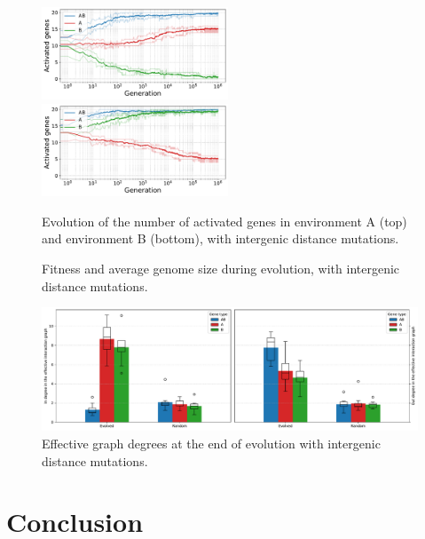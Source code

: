 \begin{figure}[H]
  \centering
  \includegraphics[width=0.495\textwidth]{param/evolve-intergene/gene_activity_env_A.pdf}
  \includegraphics[width=0.495\textwidth]{param/evolve-intergene/gene_activity_env_B.pdf}
  \caption[Evolution of the number of activated genes in each environment, with intergenic distance mutations]{Evolution of the number of activated genes in environment A (top) and environment B (bottom), with intergenic distance mutations.}
  \end{figure}


\begin{figure}
\centering
\begin{elasticrow}[width=\textwidth]
\end{elasticrow}
\caption[Average fitness and intergenic size during evolution, with intergenic distance mutations]{Fitness and average genome size during evolution, with intergenic distance mutations.}
\end{figure}



\begin{figure}
\centering
\includegraphics[width=\textwidth]{param/evolve-intergene/effective_graph_combined_degree.pdf}
\caption{Effective graph degrees at the end of evolution with intergenic distance mutations.}
\end{figure}

\section{Conclusion}

